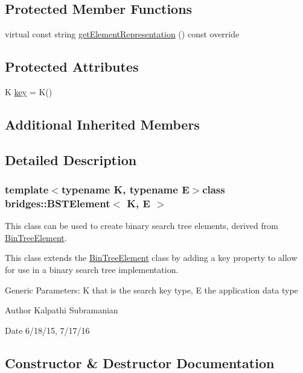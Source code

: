 \subsection*{Protected Member Functions}
\begin{DoxyCompactItemize}
\item 
virtual const string \hyperlink{classbridges_1_1_b_s_t_element_afde56af31362642e6d65bf29f1b056d2}{get\+Element\+Representation} () const  override
\end{DoxyCompactItemize}
\subsection*{Protected Attributes}
\begin{DoxyCompactItemize}
\item 
K \hyperlink{classbridges_1_1_b_s_t_element_aebe8a0958484a0e28e777b423079bae2}{key} = K()
\end{DoxyCompactItemize}
\subsection*{Additional Inherited Members}


\subsection{Detailed Description}
\subsubsection*{template$<$typename K, typename E$>$class bridges\+::\+B\+S\+T\+Element$<$ K, E $>$}

This class can be used to create binary search tree elements, derived from \hyperlink{classbridges_1_1_bin_tree_element}{Bin\+Tree\+Element}. 

This class extends the \hyperlink{classbridges_1_1_bin_tree_element}{Bin\+Tree\+Element} class by adding a key property to allow for use in a binary search tree implementation.

Generic Parameters\+: K that is the search key type, E the application data type

\begin{DoxyAuthor}{Author}
Kalpathi Subramanian 
\end{DoxyAuthor}
\begin{DoxyDate}{Date}
6/18/15, 7/17/16 
\end{DoxyDate}


\subsection{Constructor \& Destructor Documentation}
\hypertarget{classbridges_1_1_b_s_t_element_aff7dbbb4011e85ea492d9a0c921895c5}{}
